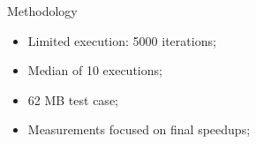 \begin{frame}{Methodology}
	\begin{itemize}
		\vfill
		\item Limited execution: 5000 iterations;
		\vfill
		\item Median of 10 executions;
		\vfill
		\item 62 MB test case;
		\vfill
		\item Measurements focused on final speedups;
		\vfill
	\end{itemize}
\end{frame}
